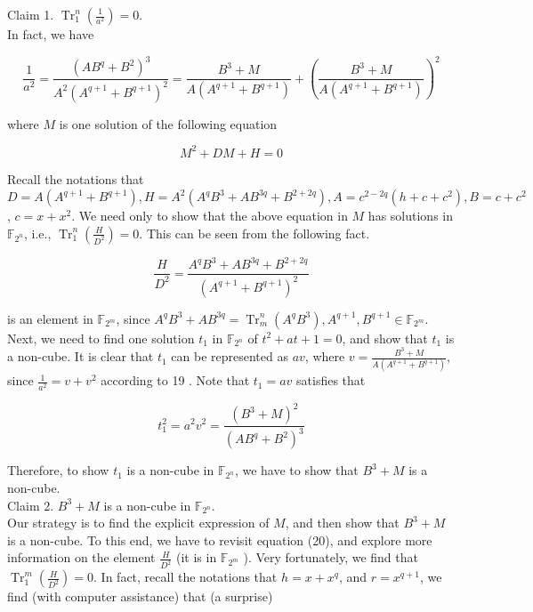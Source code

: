 \documentclass[10pt]{article}
\begin{document}
Claim 1. $\operatorname{Tr}_{1}^{n}\left(\frac{1}{a^{2}}\right)=0$.\\
In fact, we have


\begin{equation*}
\frac{1}{a^{2}}=\frac{\left(A B^{q}+B^{2}\right)^{3}}{A^{2}\left(A^{q+1}+B^{q+1}\right)^{2}}=\frac{B^{3}+M}{A\left(A^{q+1}+B^{q+1}\right)}+\left(\frac{B^{3}+M}{A\left(A^{q+1}+B^{q+1}\right)}\right)^{2} \tag{19}
\end{equation*}


where $M$ is one solution of the following equation


\begin{equation*}
M^{2}+D M+H=0 \tag{20}
\end{equation*}


Recall the notations that $D=A\left(A^{q+1}+B^{q+1}\right), H=A^{2}\left(A^{q} B^{3}+A B^{3 q}+B^{2+2 q}\right), A=c^{2-2 q}\left(h+c+c^{2}\right), B=c+c^{2}$, $c=x+x^{2}$. We need only to show that the above equation in $M$ has solutions in $\mathbb{F}_{2^{n}}$, i.e., $\operatorname{Tr}_{1}^{n}\left(\frac{H}{D^{2}}\right)=0$. This can be seen from the following fact.

$$
\frac{H}{D^{2}}=\frac{A^{q} B^{3}+A B^{3 q}+B^{2+2 q}}{\left(A^{q+1}+B^{q+1}\right)^{2}}
$$

is an element in $\mathbb{F}_{2^{m}}$, since $A^{q} B^{3}+A B^{3 q}=\operatorname{Tr}_{m}^{n}\left(A^{q} B^{3}\right), A^{q+1}, B^{q+1} \in \mathbb{F}_{2^{m}}$.\\
Next, we need to find one solution $t_{1}$ in $\mathbb{F}_{2^{n}}$ of $t^{2}+a t+1=0$, and show that $t_{1}$ is a non-cube. It is clear that $t_{1}$ can be represented as $a v$, where $v=\frac{B^{3}+M}{A\left(A^{q+1}+B^{q+1}\right)}$, since $\frac{1}{a^{2}}=v+v^{2}$ according to 19 . Note that $t_{1}=a v$ satisfies that

$$
t_{1}^{2}=a^{2} v^{2}=\frac{\left(B^{3}+M\right)^{2}}{\left(A B^{q}+B^{2}\right)^{3}}
$$

Therefore, to show $t_{1}$ is a non-cube in $\mathbb{F}_{2^{n}}$, we have to show that $B^{3}+M$ is a non-cube.\\
Claim 2. $B^{3}+M$ is a non-cube in $\mathbb{F}_{2^{n}}$.\\
Our strategy is to find the explicit expression of $M$, and then show that $B^{3}+M$ is a non-cube. To this end, we have to revisit equation (20), and explore more information on the element $\frac{H}{D^{2}}$ (it is in $\mathbb{F}_{2^{m}}$ ). Very fortunately, we find that $\operatorname{Tr}_{1}^{m}\left(\frac{H}{D^{2}}\right)=0$. In fact, recall the notations that $h=x+x^{q}$, and $r=x^{q+1}$, we find (with computer assistance) that (a surprise)
\end{document}
